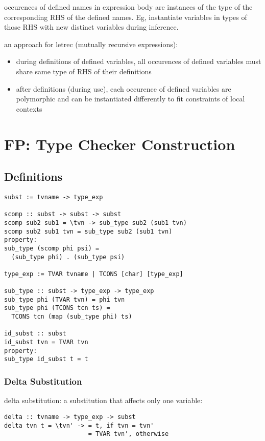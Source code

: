 \documentclass[8pt]{extarticle}
\begin{document}
\begin{multicols*}{2}
occurences of defined names in expression body are instances of the type of the corresponding RHS of the defined names. Eg, instantiate variables in types of those RHS with new distinct variables during inference.

an approach for letrec (mutually recursive expressions):
\begin{itemize}
\item during definitions of defined variables, all occurences of defined variables must share same type of RHS of their definitions
\item after definitions (during use), each occurence of defined variables are polymorphic and can be instantiated differently to fit constraints of local contexts
\end{itemize}

\vfill\null
\columnbreak

\section{FP: Type Checker Construction}

\subsection{Definitions}

\begin{verbatim}
subst := tvname -> type_exp

scomp :: subst -> subst -> subst
scomp sub2 sub1 = \tvn -> sub_type sub2 (sub1 tvn)
scomp sub2 sub1 tvn = sub_type sub2 (sub1 tvn)
property:
sub_type (scomp phi psi) =
  (sub_type phi) . (sub_type psi)

type_exp := TVAR tvname | TCONS [char] [type_exp]

sub_type :: subst -> type_exp -> type_exp
sub_type phi (TVAR tvn) = phi tvn
sub_type phi (TCONS tcn ts) =
  TCONS tcn (map (sub_type phi) ts)

id_subst :: subst
id_subst tvn = TVAR tvn
property:
sub_type id_subst t = t
\end{verbatim}

\subsubsection{Delta Substitution}
delta substitution: a substitution that affects only one variable:

\begin{verbatim}
delta :: tvname -> type_exp -> subst
delta tvn t = \tvn' -> = t, if tvn = tvn'
                       = TVAR tvn', otherwise


\end{verbatim}
\end{multicols*}
\end{document}
